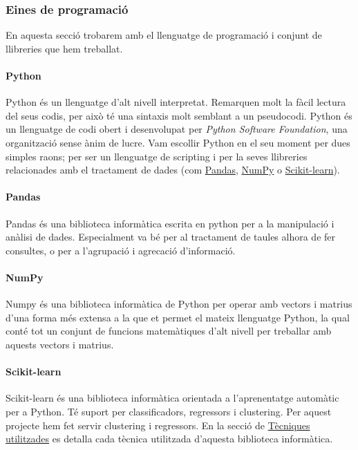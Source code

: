 \documentclass[12pt,a4paper,catalan]{article}
\begin{document}
\newpage
\subsubsection{Eines de programació}
En aquesta secció trobarem amb el llenguatge de programació i conjunt de llibreries que hem treballat.

\paragraph{Python}
Python és un llenguatge d'alt nivell interpretat. Remarquen molt la fàcil lectura del seus codis, per això té una sintaxis molt semblant a un pseudocodi. Python és un llenguatge de codi obert i desenvolupat per \textit{Python Software Foundation}, una organització sense ànim de lucre. Vam escollir Python en el seu moment per dues simples raons; per ser un llenguatge de scripting i per la seves llibreries relacionades amb el tractament de dades (com \hyperlink{pandas}{Pandas}, \hyperlink{numpy}{NumPy} o \hyperlink{sklearn}{Scikit-learn}).


\hypertarget{pandas}{
	\paragraph{Pandas}
}
Pandas és una biblioteca informàtica escrita en python per a la manipulació i anàlisi de dades. Especialment va bé per al tractament de taules alhora de fer consultes, o per a l'agrupació i agrecació d'informació.

\hypertarget{numpy}{
	\paragraph{NumPy}
}
Numpy és una biblioteca informàtica de Python per operar amb vectors i matrius d'una forma més extensa a la que et permet el mateix llenguatge Python, la qual conté tot un conjunt de funcions matemàtiques d'alt nivell per treballar amb aquests vectors i matrius.

\hypertarget{sklearn}{
	\paragraph{Scikit-learn}
}
Scikit-learn és una biblioteca informàtica orientada a l'aprenentatge automàtic per a Python. Té suport per classificadors, regressors i clustering. Per aquest projecte hem fet servir clustering i regressors. En la secció de \hyperlink{tecniquesutilitzades}{Tècniques utilitzades} es detalla cada tècnica utilitzada d'aquesta biblioteca informàtica.
\end{document}
